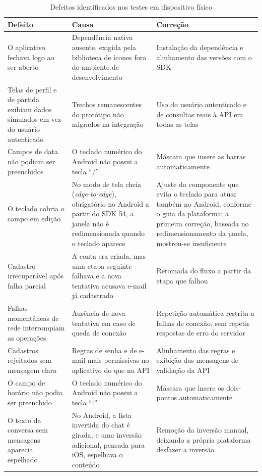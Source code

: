 \documentclass[a4paper, 12pt]{article}
\renewcommand{\footnotesize}{\fontsize{10}{12}\selectfont}
\begin{document}
\begin{justify}
\begin{table}[H]
\centering
\caption{Defeitos identificados nos testes em dispositivo físico}
\label{tab:defeitos}
\footnotesize
\begin{tabular}{|p{4.6cm}|p{4.7cm}|p{4.7cm}|}
\hline
\textbf{Defeito} & \textbf{Causa} & \textbf{Correção} \\
\hline
O aplicativo fechava logo ao ser aberto & Dependência nativa ausente, exigida pela biblioteca de ícones fora do ambiente de desenvolvimento & Instalação da dependência e alinhamento das versões com o SDK \\
\hline
Telas de perfil e de partida exibiam dados simulados em vez do usuário autenticado & Trechos remanescentes do protótipo não migrados na integração & Uso do usuário autenticado e de consultas reais à API em todas as telas \\
\hline
Campos de data não podiam ser preenchidos & O teclado numérico do Android não possui a tecla ``/'' & Máscara que insere as barras automaticamente \\
\hline
O teclado cobria o campo em edição & No modo de tela cheia (\textit{edge-to-edge}), obrigatório no Android a partir do SDK 54, a janela não é redimensionada quando o teclado aparece & Ajuste do componente que evita o teclado para atuar também no Android, conforme o guia da plataforma; a primeira correção, baseada no redimensionamento da janela, mostrou-se insuficiente \\
\hline
Cadastro irrecuperável após falha parcial & A conta era criada, mas uma etapa seguinte falhava e a nova tentativa acusava e-mail já cadastrado & Retomada do fluxo a partir da etapa que falhou \\
\hline
Falhas momentâneas de rede interrompiam as operações & Ausência de nova tentativa em caso de queda de conexão & Repetição automática restrita a falhas de conexão, sem repetir respostas de erro do servidor \\
\hline
Cadastros rejeitados sem mensagem clara & Regras de senha e de e-mail mais permissivas no aplicativo do que na API & Alinhamento das regras e exibição das mensagens de validação da API \\
\hline
O campo de horário não podia ser preenchido & O teclado numérico do Android não possui a tecla ``:'' & Máscara que insere os dois-pontos automaticamente \\
\hline
O texto da conversa sem mensagens aparecia espelhado & No Android, a lista invertida do chat é girada, e uma inversão adicional, pensada para iOS, espelhava o conteúdo & Remoção da inversão manual, deixando a própria plataforma desfazer a inversão \\

\end{tabular}
\end{table}
\end{justify}
\end{document}
